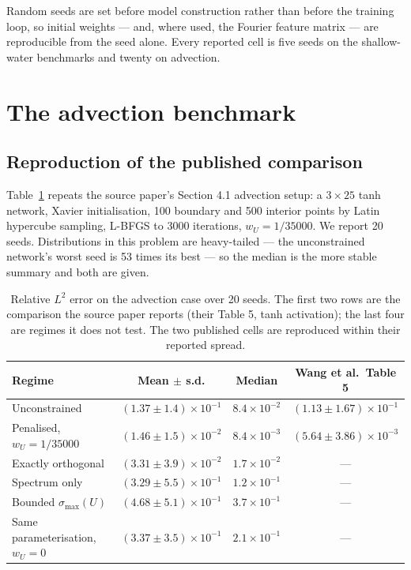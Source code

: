 \documentclass[11pt]{article}
\newcommand{\wU}{w_U}
\begin{document}
Random seeds are set before model construction rather than before the training
loop, so initial weights --- and, where used, the Fourier feature matrix --- are
reproducible from the seed alone. Every reported cell is five seeds on the
shallow-water benchmarks and twenty on advection.

\section{The advection benchmark}
\label{sec:mechanism}

\subsection{Reproduction of the published comparison}

Table~\ref{tab:advection} repeats the source paper's Section 4.1 advection
setup: a $3\times25$ tanh network, Xavier initialisation, 100 boundary and 500
interior points by Latin hypercube sampling, L-BFGS to 3000 iterations,
$\wU = 1/35000$. We report 20 seeds. Distributions in this problem are
heavy-tailed --- the unconstrained network's worst seed is 53 times its best
--- so the median is the more stable summary and both are given.

\begin{table}[htbp]
\centering
\caption{Relative $L^2$ error on the advection case over 20 seeds. The first
two rows are the comparison the source paper reports (their Table 5, tanh
activation); the last four are regimes it does not test. The two published cells are reproduced within
their reported spread.}
\label{tab:advection}
\begin{tabular}{lccc}
\toprule
Regime & Mean $\pm$ s.d. & Median & Wang et al.\ Table 5 \\
\midrule
Unconstrained            & $(1.37\pm1.4)\times10^{-1}$ & $8.4\times10^{-2}$ & $(1.13\pm1.67)\times10^{-1}$ \\
Penalised, $\wU=1/35000$ & $(1.46\pm1.5)\times10^{-2}$ & $8.4\times10^{-3}$ & $(5.64\pm3.86)\times10^{-3}$ \\
Exactly orthogonal       & $(3.31\pm3.9)\times10^{-2}$ & $1.7\times10^{-2}$ & --- \\
Spectrum only            & $(3.29\pm5.5)\times10^{-1}$ & $1.2\times10^{-1}$ & --- \\
Bounded $\sigma_{\max}(U)$     & $(4.68\pm5.1)\times10^{-1}$ & $3.7\times10^{-1}$ & --- \\
Same parameterisation, $\wU=0$ & $(3.37\pm3.5)\times10^{-1}$ & $2.1\times10^{-1}$ & --- \\
\bottomrule
\end{tabular}
\end{table}
\end{document}
